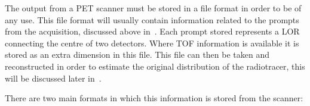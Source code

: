                 The output from a \gls{PET} scanner must be stored in a %
                file format in order to be of any use. %
                This file format will usually contain information related to the prompts from the acquisition, discussed above in~. Each prompt stored represents a \gls{LOR} connecting the centre of two detectors. %
                Where \gls{TOF} information is available it is stored as an extra dimension in this file. This file can then be taken and reconstructed in order to estimate the original distribution of the radiotracer, this will be discussed later in~.
                
                There are two main formats in which this information is stored from the scanner:
                
